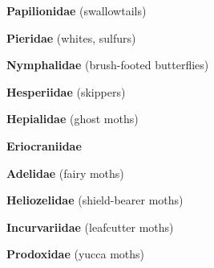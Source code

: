 \documentclass[letterpaper,10pt]{article}
\begin{document}
{\makebox[0.6cm]{}  \textbf{Papilionidae} (swallowtails) \par
\makebox[0.6cm]{}  \textbf{Pieridae} (whites, sulfurs) \par
\makebox[0.6cm]{}  \textbf{Nymphalidae} (brush-footed butterflies) \par
\makebox[0.6cm]{}  \textbf{Hesperiidae} (skippers) \par
\makebox[0.6cm]{}  \textbf{Hepialidae} (ghost moths) \par
\makebox[0.6cm]{}  \textbf{Eriocraniidae} \par
\makebox[0.6cm]{}  \textbf{Adelidae} (fairy moths) \par
\makebox[0.6cm]{}  \textbf{Heliozelidae} (shield-bearer moths) \par
\makebox[0.6cm]{}  \textbf{Incurvariidae} (leafcutter moths) \par
\makebox[0.6cm]{}  \textbf{Prodoxidae} (yucca moths) \par
}
\end{document}
